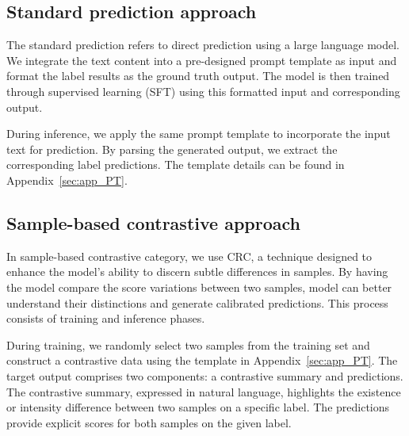 \documentclass[11pt]{article}
\begin{document}
\subsection{Standard prediction approach}
\label{sec:SP}

The standard prediction refers to direct prediction using a large language model. We integrate the text content into a pre-designed prompt template as input and format the label results as the ground truth output. The model is then trained through supervised learning (SFT) using this formatted input and corresponding output.

During inference, we apply the same prompt template to incorporate the input text for prediction. By parsing the generated output, we extract the corresponding label predictions. The template details can be found in Appendix~\ref{sec:app_PT}.

\subsection{Sample-based contrastive approach}
\label{sec:CRC}
In sample-based contrastive category, we use CRC, a technique designed to enhance the model’s ability to discern subtle differences in samples. 
By having the model compare the score variations between two samples, model can better understand their distinctions and generate calibrated predictions.
This process consists of training and inference phases.


During training, we randomly select two samples from the training set and construct a contrastive data using the template in Appendix~\ref{sec:app_PT}. The target output comprises two components: a contrastive summary and predictions. The contrastive summary, expressed in natural language, highlights the existence or intensity difference between two samples on a specific label. The predictions provide explicit scores for both samples on the given label. 
\end{document}
